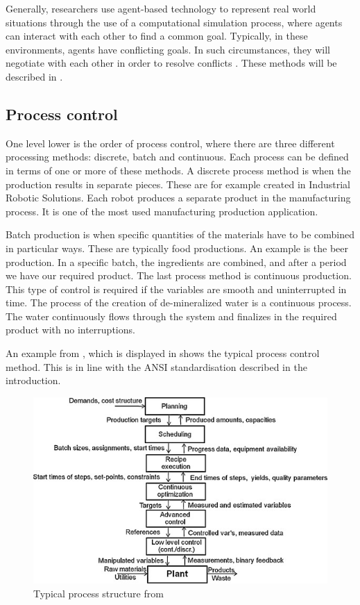 Generally, researchers use agent-based technology to represent real world situations through the use of a computational simulation process, where agents can interact with each other to find a common goal. Typically, in these environments, agents have conflicting goals. In such circumstances, they will negotiate with each other in order to resolve conflicts \citep{rosa2009intelligent}. These methods will be described in .
		
	
\subsection{Process control}
One level lower is the order of process control, where there are three different processing methods: discrete, batch and continuous. Each process can be defined in terms of one or more of these methods. A discrete process method is when the production results in separate pieces. These are for example created in Industrial Robotic Solutions. Each robot produces a separate product in the manufacturing process. It is one of the most used manufacturing production application.

Batch production is when specific quantities of the materials have to be combined in particular ways. These are typically food productions. An example is the beer production. In a specific batch, the ingredients are combined, and after a period we have our required product. The last process method is continuous production. This type of control is required if the variables are smooth and uninterrupted in time. The process of the creation of de-mineralized water is a continuous process. The water continuously flows through the system and finalizes in the required product with no interruptions. 

An example from \citet{engell2012optimal}, which is displayed in  shows the typical process control method. This is in line with the ANSI standardisation described in the introduction. 

\begin{figure}[h]
\centering
\includegraphics[width=0.7\linewidth]{img/process_structure}
\caption{Typical process structure from \citep{engell2012optimal}}
\label{fig:processstructure}
\end{figure}

